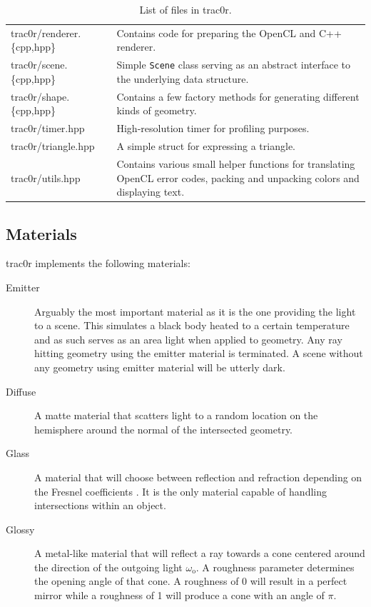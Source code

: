 \documentclass[
  twoside,
  11pt, a4paper,
  footinclude=true,
  headinclude=true,
  cleardoublepage=empty
]{scrreprt}
\begin{document}
\begin{minipage}{\textwidth}
\begin{table}[H]
\begin{tabularx}{\textwidth}{l | X}
            trac0r/renderer.\{cpp,hpp\}  & Contains code for preparing the
                                         OpenCL and C++ renderer. \\
            trac0r/scene.\{cpp,hpp\}     & Simple \texttt{Scene} class serving as an abstract interface
                                         to the underlying data structure. \\
            trac0r/shape.\{cpp,hpp\}     & Contains a few factory methods for generating different kinds
                                         of geometry.\\
            trac0r/timer.hpp           & High-resolution timer for profiling purposes. \\
            trac0r/triangle.hpp        & A simple struct for expressing a
                                         triangle. \\
            trac0r/utils.hpp           & Contains various small helper functions for translating OpenCL
                                         error codes, packing and unpacking colors and
                                         displaying text.
        \end{tabularx}
        \caption{List of files in trac0r.}
    \end{table}
\end{minipage}

\subsection{Materials}
trac0r implements the following materials:
\begin{description}
    \item[Emitter] Arguably the most important material as it is the one providing the light to a
        scene. This simulates a black body heated to a certain temperature and as such serves as an
        area light when applied to geometry. Any ray hitting geometry using the emitter material is
        terminated. A scene without any geometry using emitter material will be utterly dark.
    \item[Diffuse] A matte material that scatters light to a random location on the hemisphere
        around the normal of the intersected geometry.
    \item[Glass] A material that will choose between reflection and refraction depending on the
        Fresnel coefficients \cite{wiki:fresnel}. It is the only material capable of handling
        intersections within an object.
    \item[Glossy] A metal-like material that will reflect a ray towards a cone centered around the
        direction of the outgoing light \(\omega_\text{o}\). A roughness parameter determines 
        the opening angle of that cone. A roughness of 0 will result in a perfect mirror while a roughness
        of 1 will produce a cone with an angle of \(\pi\).
\end{description}
\end{document}
